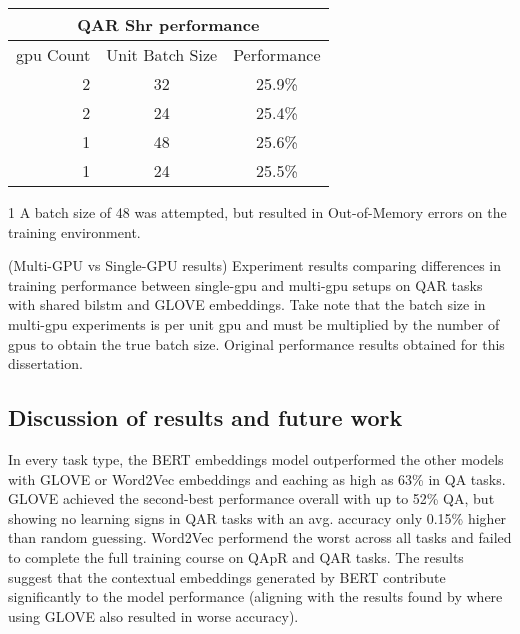 \begin{table}[]
    \begin{threeparttable}
        \begin{tabular}{rc|c}
            \toprule
            \multicolumn{3}{c}{QA\rightarrow{}R Shr performance} \\
            \midrule
            \gls{gpu} Count & Unit Batch Size & Performance      \\
            2               & 32              & 25.9\%\tnote{1}  \\
            2               & 24              & 25.4\%           \\
            1               & 48              & 25.6\%           \\
            1               & 24              & 25.5\%           \\
            \bottomrule
        \end{tabular}
        \begin{tablenotes}
            \item[1] A batch size of 48 was attempted, but resulted in Out-of-Memory errors on the training environment.
        \end{tablenotes}
    \end{threeparttable}
    \captionsource(Multi-GPU vs Single-GPU results)
    {Experiment results comparing differences in training performance between single-\gls{gpu} and multi-\gls{gpu} setups on QA\rightarrow{}R tasks with shared \gls{bilstm} and GLOVE embeddings. Take note that the batch size in multi-\gls{gpu} experiments is per unit \gls{gpu} and must be multiplied by the number of \glspl{gpu} to obtain the true batch size. \label{tab:single-vs-multi-gpu-experiment-results}}
    {Original performance results obtained for this dissertation.}
\end{table}

\subsection{Discussion of results and future work}
\label{subsec:discussion_of_results_and_future_work}

In every task type, the BERT embeddings model outperformed the other models with GLOVE or Word2Vec embeddings and eaching as high as 63\% in Q\rightarrow{}A tasks.
GLOVE achieved the second-best performance overall with up to 52\% Q\rightarrow{}A, but showing no learning signs in Q\rightarrow{}AR tasks with an avg. accuracy only 0.15\% higher than random guessing.
Word2Vec performend the worst across all tasks and failed to complete the full training course on QAp\rightarrow{}R and Q\rightarrow{}AR tasks.
The results suggest that the contextual embeddings generated by BERT contribute significantly to the model performance (aligning with the results found by \citeauthor{zellers_recognition_2019} where using GLOVE also resulted in worse accuracy\cite{zellers_recognition_2019}).

